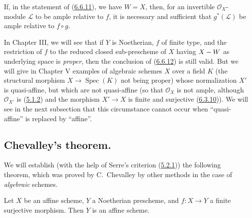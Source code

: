 \begin{corollary}[6.6.12]
\label{II.6.6.12}
If, in the statement of \textup{(\hyperref[II.6.6.11]{6.6.11})}, we have $W=X$, then,
for an invertible $\mathcal{O}_X$-module $\mathcal{L}$ to be ample
relative to $f$, it is necessary and sufficient that $g^*(\mathcal{L})$ be
ample relative to $f\circ g$.
\end{corollary}

\begin{remark}[6.6.13]
\label{II.6.6.13}
In Chapter III, we will see that if $Y$ is Noetherian, $f$ of finite type,
and the restriction of $f$ to the reduced closed sub-prescheme of $X$ having
$X- W$ as underlying space is \emph{proper}, then the conclusion of
(\hyperref[II.6.6.12]{6.6.12}) is still valid. But we will give in
Chapter V examples of algebraic schemes $X$ over a field $K$ (the
structural morphism $X\to\operatorname{Spec}(K)$ not being proper) whose
normalization $X'$ is quasi-affine, but which are not quasi-affine (so
that $\mathcal{O}_X$ is not ample, although $\mathcal{O}_{X'}$ is
(\hyperref[II.5.1.2]{5.1.2}) and the morphism $X'\to X$ is finite
and surjective (\hyperref[II.6.3.10]{6.3.10})). We will see in the next
subsection that this circumstance cannot occur when
``quasi-affine'' is replaced by ``affine''.
\end{remark}

\subsection{Chevalley's theorem.}
\label{subsection:II.6.7}

We will establish (with the help of Serre's criterion
(\hyperref[II.5.2.1]{5.2.1})) the following theorem, which was proved by
C.~Chevalley by other methods in the case of \emph{algebraic}
schemes.


\begin{theorem}[6.7.1]
\label{II.6.7.1}
Let $X$ be an affine scheme, $Y$ a Noetherian prescheme, and $f:X\to Y$ a
finite surjective morphism. Then $Y$ is an affine scheme.
\end{theorem}


